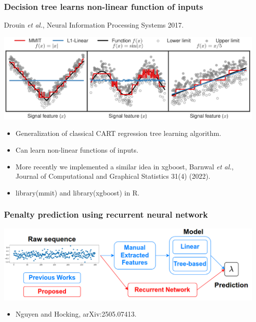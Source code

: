 \documentclass{beamer}
\begin{document}


  

\begin{frame}
  \frametitle{Decision tree learns non-linear function of inputs}
  
  Drouin \emph{et al.}, Neural Information Processing Systems 2017.

  \includegraphics[width=\linewidth]{mmit-functions}
  \begin{itemize}
  \item Generalization of classical CART regression tree learning algorithm.
  \item Can learn non-linear functions of inputs.
  \item More recently we implemented a similar idea in xgboost,
    Barnwal \emph{et al.}, Journal of Computational and Graphical Statistics 31(4) (2022).
  \item library(mmit) and library(xgboost) in R.
  \end{itemize}
\end{frame}

\begin{frame}
  \frametitle{Penalty prediction using recurrent neural network}
  
  \includegraphics[width=\linewidth]{penalty-pred-RNN}
  \begin{itemize}
  \item Nguyen and Hocking, arXiv:2505.07413.
  \end{itemize}
\end{frame}
\end{document}
